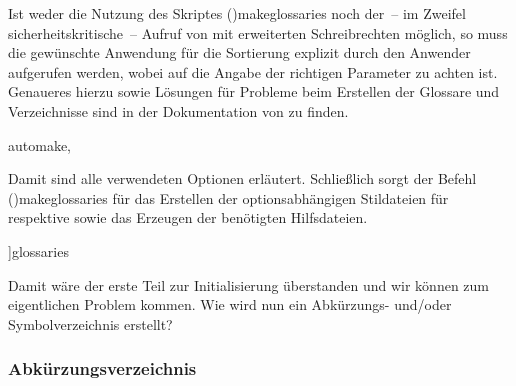 \documentclass[%
  english,ngerman,%
  cdgeometry=no,DIV=12,%
  cd=false,cdfont=false,cdtitle=true,%
  headings=normal,%
  automark,%
  listof=toc,%
]{tudscrartcl}
\begin{document}
Ist weder die Nutzung des Skriptes \File(){makeglossaries} 
noch der~-- im Zweifel sicherheitskritische~-- Aufruf von  mit 
erweiterten Schreibrechten möglich, so muss die gewünschte Anwendung für die 
Sortierung explizit durch den Anwender aufgerufen werden, wobei auf die Angabe 
der richtigen Parameter zu achten ist. Genaueres hierzu sowie Lösungen für 
Probleme beim Erstellen der Glossare und Verzeichnisse sind in der Dokumentation
von  zu finden.
%
\begin{Hint}
  automake,%
\end{Hint}
%
Damit sind alle verwendeten Optionen erläutert. Schließlich sorgt der Befehl 
\Macro(){makeglossaries} für das Erstellen der 
optionsabhängigen Stildateien für  respektive 
 sowie das Erzeugen der benötigten Hilfsdateien.
%
\begin{Preamble}
]{glossaries}
\makeglossaries

\end{Preamble}
%
Damit wäre der erste Teil zur Initialisierung überstanden und wir können zum 
eigentlichen Problem kommen. Wie wird nun ein Abkürzungs- und/oder 
Symbolverzeichnis erstellt?



\subsubsection{Abkürzungsverzeichnis}
\end{document}
